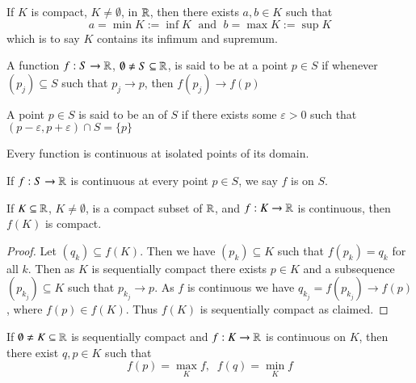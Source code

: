 If $K$ is compact, $K \neq \emptyset$, in $\mathbb R$, then there exists $a,b \in K$ such that $$a = \min K := \inf K\;\text{ and }\;b = \max K := \sup K$$ which is to say $K$ contains its infimum and supremum.

\begin{defn}
    A function $f:S\rightarrow \mathbb R$, $\emptyset \neq S \subseteq \mathbb R$, is said to be  at a point $p \in S$ if whenever $(p_j) \subseteq S$ such that $p_j\rightarrow p$, then $f(p_j)\rightarrow f(p)$
\end{defn}

\begin{defn}
    A point $p \in S$ is said to be an  of $S$ if there exists some $\varepsilon > 0$ such that $(p-\varepsilon,p+\varepsilon) \cap S = \{p\}$
\end{defn}
Every function is continuous at isolated points of its domain.

\begin{defn}
    If $f:S\rightarrow \mathbb R$ is continuous at every point $p \in S$, we say $f$ is  on $S$.
\end{defn}

\begin{prop}\label{prop:1.9.4}
    If $K \subseteq \mathbb R$, $K \neq \emptyset$, is a compact subset of $\mathbb R$, and $f:K\rightarrow \mathbb R$ is continuous, then $f(K)$ is compact.
\end{prop}
\begin{proof}
    Let $(q_k) \subseteq f(K)$. Then we have $(p_k) \subseteq K$ such that $f(p_k) = q_k$ for all $k$. Then as $K$ is sequentially compact there exists $p \in K$ and a subsequence $(p_{k_j}) \subseteq K$ such that $p_{k_j}\rightarrow p$. As $f$ is continuous we have $q_{k_j} = f(p_{k_j}) \rightarrow f(p)$, where $f(p) \in f(K)$. Thus $f(K)$ is sequentially compact as claimed.
\end{proof}

\begin{prop}\label{prop:1.9.5}
    If $\emptyset \neq K \subseteq \mathbb R$ is sequentially compact and $f:K\rightarrow \mathbb R$ is continuous on $K$, then there exist $q,p \in K$ such that $$f(p) = \max_{K}f,\;\;f(q) = \min_Kf$$
\end{prop}

